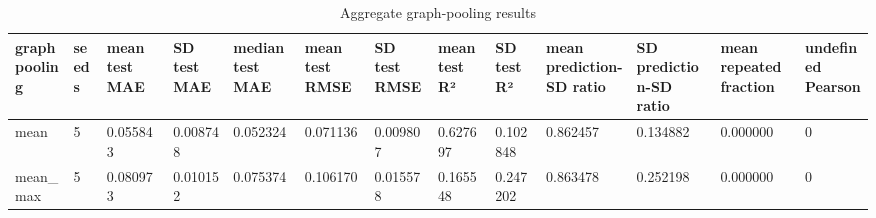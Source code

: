 \begin{table}[htbp]
\centering
\caption{Aggregate graph-pooling results}
\begin{tabular}{lllllllllllll}
\hline
graph pooling & seeds & mean test MAE & SD test MAE & median test MAE & mean test RMSE & SD test RMSE & mean test R² & SD test R² & mean prediction-SD ratio & SD prediction-SD ratio & mean repeated fraction & undefined Pearson \\
\hline
mean & 5 & 0.055843 & 0.008748 & 0.052324 & 0.071136 & 0.009807 & 0.627697 & 0.102848 & 0.862457 & 0.134882 & 0.000000 & 0 \\
mean\_max & 5 & 0.080973 & 0.010152 & 0.075374 & 0.106170 & 0.015578 & 0.165548 & 0.247202 & 0.863478 & 0.252198 & 0.000000 & 0 \\
\hline
\end{tabular}
\end{table}
